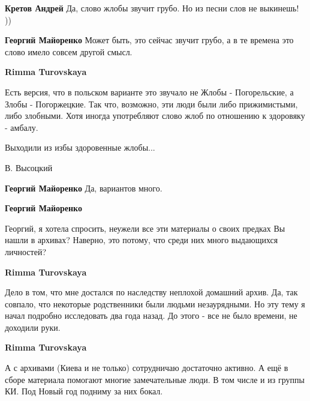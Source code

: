 \begin{itemize}
\begin{itemize}
\begin{itemize} %
\textbf{Кретов Андрей} Да, слово жлобы звучит грубо. Но из песни слов не выкинешь! ))

\textbf{Георгий Майоренко} Может быть, это сейчас звучит грубо, а в те времена это слово имело совсем другой смысл.

\textbf{Rimma Turovskaya} 

Есть версия, что в польском варианте это звучало не Жлобы - Погорельские, а
Злобы - Погоржецкие. Так что, возможно, эти люди были либо прижимистыми, либо
злобными. Хотя иногда употребляют слово жлоб по отношению к здоровяку - амбалу.

Выходили из избы
здоровенные жлобы...

В. Высоцкий

\textbf{Георгий Майоренко} Да, вариантов много.

\textbf{Георгий Майоренко} 

Георгий, я хотела спросить, неужели все эти материалы о своих предках Вы нашли
в архивах? Наверно, это потому, что среди них много выдающихся личностей?

\textbf{Rimma Turovskaya} 

Дело в том, что мне достался по наследству неплохой домашний архив. Да, так
совпало, что некоторые родственники были людьми незаурядными. Но эту тему я
начал подробно исследовать два года назад. До этого - все не было времени, не
доходили руки.


\textbf{Rimma Turovskaya} 

А с архивами (Киева и не только) сотрудничаю достаточно активно. А ещё в сборе
материала помогают многие замечательные люди. В том числе и из группы КИ. Под
Новый год подниму за них бокал.

\end{itemize} %

\end{itemize} %

\end{itemize} %
